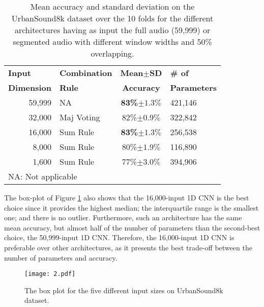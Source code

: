 \documentclass[preprint,final,12pt]{elsarticle}
\begin{document}
\begin{table*}[htpb!]
\caption{Mean accuracy and standard deviation on the UrbanSound8k dataset over the 10 folds for the different architectures having as input the full audio (59,999) or segmented audio with different window widths and 50\% overlapping.}
\centering
\footnotesize
\begin{tabular}{l l c l}
\hline\hline \textbf{Input} & \textbf{Combination} & \textbf{Mean$\pm$SD} & \textbf{\# of } \\
\textbf{Dimension} &   \textbf{Rule} & \textbf{Accuracy} & \textbf{Parameters} \\ \hline
\multicolumn{1}{r}{59,999}                                    & NA                                    & \textbf{83\%$\pm1.3\%$} & 421,146          \\
\multicolumn{1}{r}{32,000}                                    & Maj Voting                         & 82\%$\pm0.9\%$ &  322,842         \\
\multicolumn{1}{r}{16,000}                                    & Sum Rule                                & \textbf{83\%$\pm1.3\%$} & 256,538          \\
\multicolumn{1}{r}{8,000}                                     & Sum Rule                                & 80\%$\pm1.9\%$ &  116,890        \\
\multicolumn{1}{r}{1,600}                                     & Sum Rule                                & 77\%$\pm3.0\%$ &  394,906        \\ \hline
\multicolumn{4}{l}{\scriptsize{NA: Not applicable }}
\end{tabular}
\label{table:framing_acc}
\end{table*}


The box-plot of Figure \ref{fig:boxframing} also shows that the 16,000-input 1D CNN is the best choice since it provides the highest median; the interquartile range is the smallest one; and there is no outlier. Furthermore, such an architecture has the same mean accuracy, but almost half of the number of parameters than the second-best choice, the 50,999-input 1D CNN. Therefore, the 16,000-input 1D CNN is preferable over other architectures, as it presents the best trade-off between the number of parameters and accuracy. 

\begin{figure}[htpb!]
  \centering
  \centerline{\texttt{[image: 2.pdf]}}
\caption{The box plot for the five different input sizes on UrbanSound8k dataset.}
\label{fig:boxframing}
\end{figure}
\end{document}
